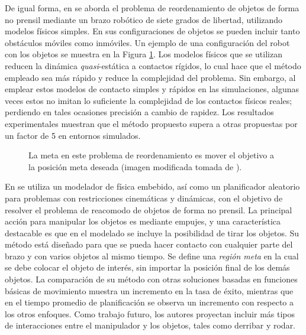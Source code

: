 De igual forma, en \cite{2018arXiv181010654P} se aborda el problema de reordenamiento de objetos de forma no prensil mediante un brazo robótico de siete grados de libertad, utilizando modelos físicos simples.
En sus configuraciones de objetos se pueden incluir tanto obstáculos móviles como inmóviles.
Un ejemplo de una configuración del robot con los objetos se muestra en la Figura \ref{fig:2018arXiv181010654P}.
Los modelos físicos que se utilizan reducen la dinámica \textit{quasi}-estática a contactos rígidos, lo cual hace que el método empleado sea más rápido y reduce la complejidad del problema.
Sin embargo, al emplear estos modelos de contacto simples y rápidos en las simulaciones, algunas veces estos no imitan lo suficiente la complejidad de los contactos físicos reales; perdiendo en tales ocasiones precisión a cambio de rapidez.
Los resultados experimentales muestran que el método propuesto supera a otras propuestas por un factor de 5 en entornos simulados.
%
\begin{figure}[H]
\caption{La meta en este problema de reordenamiento es mover el objetivo a la posición meta deseada (imagen modificada tomada de \cite{2018arXiv181010654P}).}%
\label{fig:2018arXiv181010654P}%
\end{figure}
%
En \cite{7139535} se utiliza un modelador de física embebido, así como un planificador aleatorio para problemas con restricciones cinemáticas y dinámicas, con el objetivo de resolver el problema de reacomodo de objetos de forma no prensil.
La principal acción para manipular los objetos es mediante empujes, y una característica destacable es que en el modelado se incluye la posibilidad de tirar los objetos.
Su método está diseñado para que se pueda hacer contacto con cualquier parte del brazo y con varios objetos al mismo tiempo.
Se define una \textsl{región meta} en la cual se debe colocar el objeto de interés, sin importar la posición final de los demás objetos.
La comparación de su método con otras soluciones basadas en funciones básicas de movimiento muestra un incremento en la tasa de éxito, mientras que en el tiempo promedio de planificación se observa un incremento con respecto a los otros enfoques.
Como trabajo futuro, los autores proyectan incluir más tipos de interacciones entre el manipulador y los objetos, tales como derribar y rodar.

